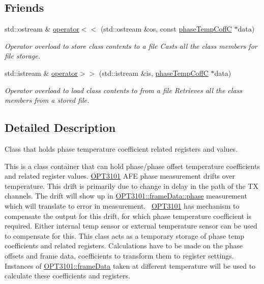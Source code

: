 \subsection*{Friends}
\begin{DoxyCompactItemize}
\item 
std\+::ostream \& \mbox{\hyperlink{class_o_p_t3101_1_1phase_temp_coff_c_a2d7a662f1af9735bc8cae566975afbec}{operator$<$$<$}} (std\+::ostream \&os, const \mbox{\hyperlink{class_o_p_t3101_1_1phase_temp_coff_c}{phase\+Temp\+CoffC}} $\ast$data)
\begin{DoxyCompactList}\small\item\em Operator overload to store class contents to a file Casts all the class members for file storage. \end{DoxyCompactList}\item 
std\+::istream \& \mbox{\hyperlink{class_o_p_t3101_1_1phase_temp_coff_c_aaf30671f3ce159d515fd178309007701}{operator$>$$>$}} (std\+::istream \&is, \mbox{\hyperlink{class_o_p_t3101_1_1phase_temp_coff_c}{phase\+Temp\+CoffC}} $\ast$data)
\begin{DoxyCompactList}\small\item\em Operator overload to load class contents to from a file Retrieves all the class members from a stored file. \end{DoxyCompactList}\end{DoxyCompactItemize}


\subsection{Detailed Description}
Class that holds phase temperature coefficient related registers and values. 

This is a class container that can hold phase/phase offset temperature coefficients and related register values. \mbox{\hyperlink{namespace_o_p_t3101}{O\+P\+T3101}} A\+FE phase measurement drifts over temperature. This drift is primarily due to change in delay in the path of the TX channels. The drift will show up in \mbox{\hyperlink{class_o_p_t3101_1_1frame_data_af8661d11405953dc378ad4d7cb0f2db6}{O\+P\+T3101\+::frame\+Data\+::phase}} measurement which will translate to error in measurement.~\newline
 \mbox{\hyperlink{namespace_o_p_t3101}{O\+P\+T3101}} has mechanism to compensate the output for this drift, for which phase temperature coefficient is required. Either internal temp sensor or external temperature sensor can be used to compensate for this. This class acts as a temporary storage of phase temp coefficients and related registers. Calculations have to be made on the phase offsets and frame data, coefficients to transform them to register settings. Instances of \mbox{\hyperlink{class_o_p_t3101_1_1frame_data}{O\+P\+T3101\+::frame\+Data}} taken at different temperature will be used to calculate these coefficients and registers. 

